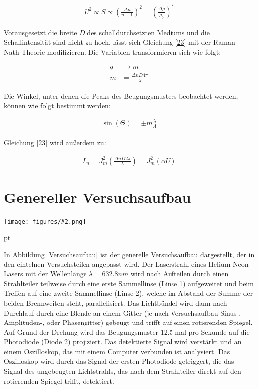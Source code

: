 \documentclass[12pt]{article}
\newcommand{\gra}[3][0.7]{
	\begin{minipage}[h!]{\textwidth}
		\centering
		\texttt{[image: figures/\#2.png]}
		\captionof{figure}{#3}
	\end{minipage}
	\vskip 30 pt
}
\begin{document}
\begin{align}
U^2 \propto S \propto \left( \frac{\Delta n}{n -1} \right)^2 = \left( \frac{\Delta \rho}{\rho_0}\right)^2  
\end{align}

Vorausgesetzt die breite $D$ des schalldurchsetzten Mediums und die Schallintensität sind nicht zu hoch, lässt sich Gleichung \ref{23} mit der Raman-Nath-Theorie modifizieren. Die Variablen transformieren sich wie folgt:

\begin{align}
q &\rightarrow m\\
m &= \frac{\Delta n D 4 \pi}{\lambda}
\end{align}

Die Winkel, unter denen die Peaks des Beugungsmusters beobachtet werden, können wie folgt bestimmt werden:

\begin{align}
\sin\left( \Theta\right) = \pm m \frac{\lambda}{\Lambda}
\end{align}

Gleichung \ref{23} wird außerdem zu: \textsuperscript{\cite{rana}}

\begin{align}
I_m = J_m^2 \left( \frac{\Delta n D 2 \pi}{\lambda} \right) = J_m^2\left(\alpha U \right) 
\end{align}
\newpage
\section{Genereller Versuchsaufbau} \label{Aufbau}

\gra[1]{Versuchsaufbau}{Versuchsaufbau \label{Versuchsaufbau} \textsuperscript{\cite{anleitung}}}

In Abbildung \ref{Versuchsaufbau} ist der generelle Versuchsaufbau dargestellt, der in den eintelnen Versuchsteilen angepasst wird.
Der Laserstrahl eines Helium-Neon-Lasers mit der Wellenlänge $\lambda = 632.8 nm$ wird nach Aufteilen durch einen Strahlteiler  teilweise durch eine erste Sammellinse (Linse 1) aufgeweitet und beim Treffen auf eine zweite Sammellinse (Linse 2), welche im Abstand der Summe der beiden Brennweiten steht, parallelisiert. Das Lichtbündel wird dann nach Durchlauf durch eine Blende an einem Gitter (je nach Versuchsaufbau Sinus-, Amplituden-, oder Phasengitter) gebeugt und trifft auf einen rotierenden Spiegel. Auf Grund der Drehung wird das Beugungsmuster 12.5 mal pro Sekunde auf die Photodiode (Diode 2) projiziert. Das detektierte Signal wird verstärkt und an einem Oszilloskop, das mit einem Computer verbunden ist analysiert. Das Oszilloskop wird durch das Signal der ersten Photodiode getriggert, die das Signal des ungebeugten Lichtstrahls, das nach dem Strahlteiler direkt auf den rotierenden Spiegel trifft, detektiert.
\end{document}

